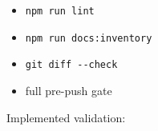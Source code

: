 \begin{itemize}
\item
  \texttt{n\allowbreak{}p\allowbreak{}m\allowbreak{} \allowbreak{}r\allowbreak{}u\allowbreak{}n\allowbreak{} \allowbreak{}l\allowbreak{}i\allowbreak{}n\allowbreak{}t}
\item
  \texttt{n\allowbreak{}p\allowbreak{}m\allowbreak{} \allowbreak{}r\allowbreak{}u\allowbreak{}n\allowbreak{} \allowbreak{}d\allowbreak{}o\allowbreak{}c\allowbreak{}s\allowbreak{}:\allowbreak{}i\allowbreak{}n\allowbreak{}v\allowbreak{}e\allowbreak{}n\allowbreak{}t\allowbreak{}o\allowbreak{}r\allowbreak{}y}
\item
  \texttt{g\allowbreak{}i\allowbreak{}t\allowbreak{} \allowbreak{}d\allowbreak{}i\allowbreak{}f\allowbreak{}f\allowbreak{} \allowbreak{}-\allowbreak{}-\allowbreak{}c\allowbreak{}h\allowbreak{}e\allowbreak{}c\allowbreak{}k}
\item
  full pre-push gate
\end{itemize}

Implemented validation:

